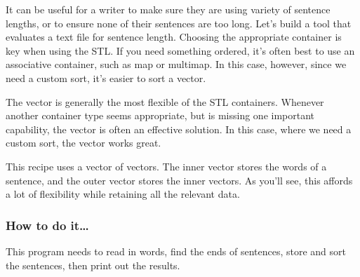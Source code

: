 
It can be useful for a writer to make sure they are using variety of sentence lengths, or to ensure none of their sentences are too long. Let's build a tool that evaluates a text file for sentence length.
Choosing the appropriate container is key when using the STL. If you need something ordered, it's often best to use an associative container, such as map or multimap. In this case, however, since we need a custom sort, it's easier to sort a vector.

The vector is generally the most flexible of the STL containers. Whenever another container type seems appropriate, but is missing one important capability, the vector is often an effective solution. In this case, where we need a custom sort, the vector works great.

This recipe uses a vector of vectors. The inner vector stores the words of a sentence, and the outer vector stores the inner vectors. As you'll see, this affords a lot of flexibility while retaining all the relevant data.

\subsubsection{How to do it…}

This program needs to read in words, find the ends of sentences, store and sort the sentences, then print out the results.

